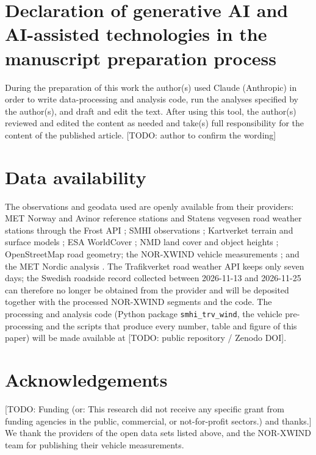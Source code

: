 \documentclass[preprint,12pt]{elsarticle}
\newcommand{\todo}[1]{\textcolor{red!70!black}{[TODO: #1]}}
\begin{document}
\section*{Declaration of generative AI and AI-assisted technologies in the manuscript preparation process}
During the preparation of this work the author(s) used Claude (Anthropic) in order to write data-processing and analysis code, run the analyses specified by the author(s), and draft and edit the text. After using this tool, the author(s) reviewed and edited the content as needed and take(s) full responsibility for the content of the published article. \todo{author to confirm the wording}

\section*{Data availability}
{\sloppy The observations and geodata used are openly available from their providers: MET Norway and Avinor reference stations and Statens vegvesen road weather stations through the Frost API \citep{Frost}; SMHI observations \citep{SMHIopen}; Kartverket terrain and surface models \citep{Kartverket}; ESA WorldCover \citep{WorldCover}; NMD land cover and object heights \citep{NMD}; OpenStreetMap road geometry; the NOR-XWIND vehicle measurements \citep{NORXWIND}; and the MET Nordic analysis \citep{MetNordic}. The Trafikverket road weather API \citep{TRVapi} keeps only seven days; the Swedish roadside record collected between 2026-11-13 and 2026-11-25 can therefore no longer be obtained from the provider and will be deposited together with the processed NOR-XWIND segments and the code. The processing and analysis code (Python package \texttt{smhi\_trv\_wind}, the vehicle pre-processing and the scripts that produce every number, table and figure of this paper) will be made available at \todo{public repository / Zenodo DOI}.\par}

\section*{Acknowledgements}
\todo{Funding (or: This research did not receive any specific grant from funding agencies in the public, commercial, or not-for-profit sectors.) and thanks.} We thank the providers of the open data sets listed above, and the NOR-XWIND team for publishing their vehicle measurements.





\end{document}
